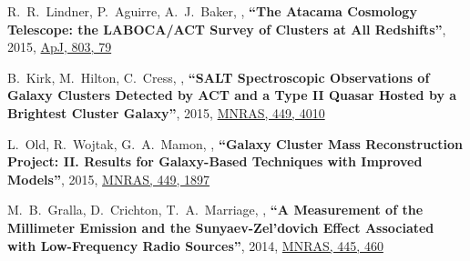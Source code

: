 \documentclass{article}
\def\myself{\textbf{\color{red} C.~Sif\'on}}
\def\apj{ApJ}
\def\mnras{MNRAS}
\begin{document}
\begin{etaremune}
\item
R.~R.~Lindner, P.~Aguirre, A.~J.~Baker, ,
\textbf{``The Atacama Cosmology Telescope: the LABOCA/ACT Survey of Clusters at All Redshifts''},
2015, \href{http://adsabs.harvard.edu/adsabs/abs/2015ApJ...803...79L}{\apj, 803, 79}

\item
B.~Kirk, M.~Hilton, C.~Cress, ,
\textbf{``SALT Spectroscopic Observations of Galaxy Clusters Detected by ACT and a Type II Quasar 
Hosted by a Brightest Cluster Galaxy''},
2015, \href{http://adsabs.harvard.edu/adsabs/abs/2015MNRAS.449.4010K}{\mnras, 449, 4010}

\item
L.~Old, R.~Wojtak, G.~A.~Mamon, ,
\textbf{``Galaxy Cluster Mass Reconstruction Project: II. Results for Galaxy-Based Techniques with 
Improved Models''},
2015, \href{http://adsabs.harvard.edu/adsabs/abs/2015MNRAS.449.1897O}{\mnras, 449, 1897}

\item
M.~B.~Gralla, D.~Crichton, T.~A.~Marriage, ,
\textbf{``A Measurement of the Millimeter Emission and the Sunyaev-Zel'dovich Effect Associated with 
Low-Frequency Radio Sources''},
2014, \href{http://adsabs.harvard.edu/adsabs/abs/2014MNRAS.445..460G}{\mnras, 445, 460}


\end{etaremune}
\end{document}

